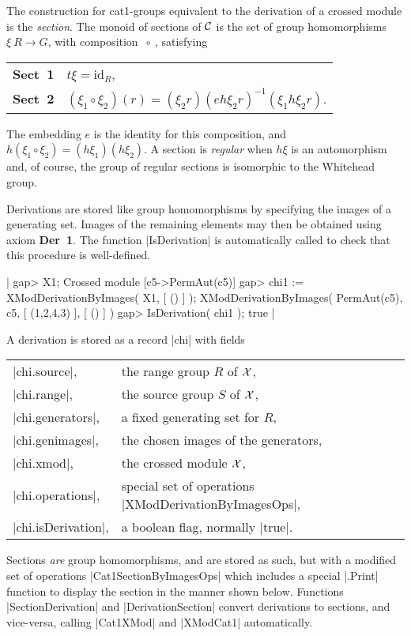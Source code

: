 The construction for cat1-groups equivalent to the derivation of a
crossed module is the {\em section}. 
The monoid of sections of  ${\cal C}$  is the set of group homomorphisms
$\xi \: R \to G$, with composition  $\ \circ \ $,  satisfying\:
\begin{center}
\begin{tabular}{l l}
\textbf{Sect\ 1\:}  &  $t \xi = \mathrm{id}_R$,               \\
\textbf{Sect\ 2\:}  &  $(\xi_1 \circ \xi_2)(r) =
                       (\xi_{2}r)(e h \xi_{2}r)^{-1}(\xi_{1} h \xi_{2}r)$.
\end{tabular}
\end{center}
The embedding  $e$  is the identity for this composition,
and  $h(\xi_1 \circ \xi_2) = (h \xi_1)(h \xi_2)$.
A section is  {\em regular}  when  $h \xi$  is an automorphism and,
of course, the group of regular sections is isomorphic to the
Whitehead group.

Derivations are stored like group homomorphisms by specifying the images
of a generating set.  Images of the remaining elements may then be
obtained using axiom  \textbf{Der\ 1}.  The function |IsDerivation|
is automatically called to check that this procedure is well-defined.

|    gap> X1;
    Crossed module [c5->PermAut(c5)]
    gap> chi1 := XModDerivationByImages( X1, [ () ] );
    XModDerivationByImages( PermAut(c5), c5, [ (1,2,4,3) ], [ () ] )
    gap> IsDerivation( chi1 );
    true  |

A derivation is stored as a record |chi| with fields\:

\begin{tabular}{ll}
|chi.source|,      & the range group $R$ of ${\cal X}$,         \\
|chi.range|,       & the source group $S$ of ${\cal X}$,        \\
|chi.generators|,  & a fixed generating set for $R$,            \\
|chi.genimages|,   & the chosen images of the generators,       \\
|chi.xmod|,        & the crossed module ${\cal X}$,             \\
|chi.operations|,  & special set of operations |XModDerivationByImagesOps|, \\
|chi.isDerivation|,& a boolean flag, normally |true|.
\end{tabular}

Sections \emph{are} group homomorphisms, and are stored as such, but with
a modified set of operations  |Cat1SectionByImagesOps|  which includes
a special |.Print| function to display the section in the manner shown below.
Functions |SectionDerivation| and |DerivationSection| convert derivations to 
sections, and vice-versa, calling |Cat1XMod| and |XModCat1| automatically.

